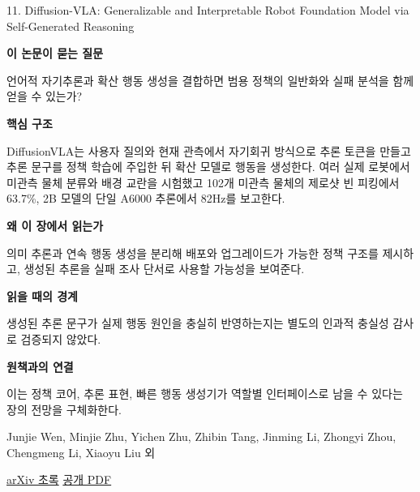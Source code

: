 \documentclass[11pt,openany]{book}
\begin{document}
\begin{termcard}{11. Diffusion-VLA: Generalizable and Interpretable Robot Foundation Model via Self-Generated Reasoning}

\par

\medskip

{\sffamily\bfseries\color{deepblue} 이 논문이 묻는 질문}\par

언어적 자기추론과 확산 행동 생성을 결합하면 범용 정책의 일반화와 실패 분석을 함께 얻을 수 있는가?

\smallskip

{\sffamily\bfseries\color{deepblue} 핵심 구조}\par

DiffusionVLA는 사용자 질의와 현재 관측에서 자기회귀 방식으로 추론 토큰을 만들고 추론 문구를 정책 학습에 주입한 뒤 확산 모델로 행동을 생성한다. 여러 실제 로봇에서 미관측 물체 분류와 배경 교란을 시험했고 102개 미관측 물체의 제로샷 빈 피킹에서 63.7\%, 2B 모델의 단일 A6000 추론에서 82Hz를 보고한다.

\smallskip

{\sffamily\bfseries\color{deepblue} 왜 이 장에서 읽는가}\par

의미 추론과 연속 행동 생성을 분리해 배포와 업그레이드가 가능한 정책 구조를 제시하고, 생성된 추론을 실패 조사 단서로 사용할 가능성을 보여준다.

\smallskip

{\sffamily\bfseries\color{coral} 읽을 때의 경계}\par

생성된 추론 문구가 실제 행동 원인을 충실히 반영하는지는 별도의 인과적 충실성 감사로 검증되지 않았다.

\smallskip

{\sffamily\bfseries\color{teal} 원책과의 연결}\par

이는 정책 코어, 추론 표현, 빠른 행동 생성기가 역할별 인터페이스로 남을 수 있다는 장의 전망을 구체화한다.

\medskip

{\footnotesize\color{muted} Junjie Wen, Minjie Zhu, Yichen Zhu, Zhibin Tang, Jinming Li, Zhongyi Zhou, Chengmeng Li, Xiaoyu Liu 외\par

\href{https://arxiv.org/abs/2412.03293}{arXiv 초록} \quad \href{https://arxiv.org/pdf/2412.03293}{공개 PDF}\par}

\end{termcard}
\end{document}
